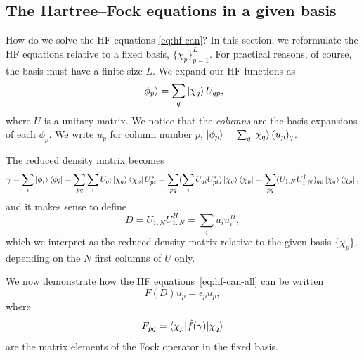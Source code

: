 \documentclass{report}
\theoremstyle{plain}
\theoremstyle{definition}
\begin{document}
\subsection{The Hartree--Fock equations in a given basis}

How do we solve the HF equations \eqref{eq:hf-can}? In this section,
we reformulate the HF equations relative to a fixed basis,
$\{\chi_p\}_{p=1}^L$. For practical reasons, of course, the basis must
have a finite size $L$. We
expand our HF functions as
\begin{equation}
  \ket{\phi_p} = \sum_q  \ket{\chi_q} U_{qp} ,
\end{equation}
where $U$ is a unitary matrix. We notice that the \emph{columns} are
the basis expansions of each $\phi_p$.  We write $u_p$ for column
number $p$, $\ket{\phi_p}=\sum_q \ket{\chi_q} (u_p)_q$.

The reduced density matrix becomes
\begin{equation}
  \gamma = \sum_i \ket{\phi_i}\bra{\phi_i} = \sum_{pq}\sum_i
  {U}_{qi}\ket{\chi_q}\bra{\chi_{p}} {U}_{pi}^* =
  \sum_{pq} (\sum_i U_{qi} U_{pi}^*) \ket{\chi_q}\bra{\chi_p} =
  \sum_{pq} (U_{1:N}U_{1:N}^\dag)_{qp} \ket{\chi_q}\bra{\chi_p},
\end{equation}
and it makes sense to define
\begin{equation}
  D = U_{1:N} U_{1:N}^H = \sum_i u_i u_i^H,
\end{equation}
which we interpret as the reduced density matrix relative to the given basis
$\{\chi_p\}$, depending on the $N$ first columns of ${U}$
only.

We now demonstrate how the HF equations~\eqref{eq:hf-can-all} can be written
\begin{equation}
  F(D) u_p = \epsilon_p u_p, \label{eq:hf-can-matrix}
\end{equation}
where
\begin{equation}
  F_{pq} = \braket{\chi_p|\hat{f}(\gamma)|\chi_q}
\end{equation}
are the matrix elements of the Fock operator in the fixed basis.

\end{document}
